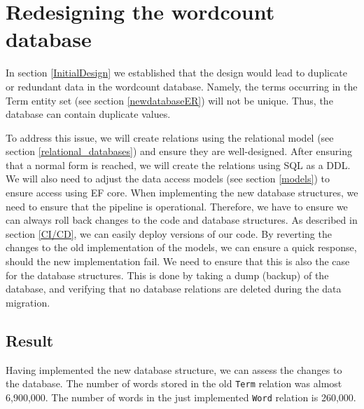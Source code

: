 \section{Redesigning the wordcount database}
In section \ref{InitialDesign} we established that the design would lead to duplicate or redundant data in the wordcount database.
Namely, the terms occurring in the Term entity set (see section \ref{newdatabaseER}) will not be unique. 
Thus, the database can contain duplicate values.
 
To address this issue, we will create relations using the relational model (see section \ref{relational_databases}) and ensure they are well-designed.
After ensuring that a normal form is reached, we will create the relations using SQL as a DDL.
We will also need to adjust the data access models (see section \ref{models}) to ensure access using EF core.
When implementing the new database structures, we need to ensure that the pipeline is operational. 
Therefore, we have to ensure we can always roll back changes to the code and database structures.
As described in section \ref{CI/CD}, we can easily deploy versions of our code. By reverting the changes to the old implementation of the models, we can ensure a quick response, should the new implementation fail.
We need to ensure that this is also the case for the database structures.
This is done by taking a dump (backup) of the database, and verifying that no database relations are deleted during the data migration.




\subsection{Result}
Having implemented the new database structure, we can assess the changes to the database. 
The number of words stored in the old \texttt{Term} relation was almost 6,900,000.
The number of words in the just implemented \texttt{Word} relation is 260,000.

